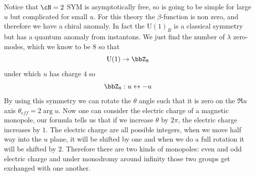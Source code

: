 \documentclass[11pt]{article}
\theoremstyle{definition}
\numberwithin{equation}{section}
\newcommand*\U{\mathrm{U}}
\begin{document}
Notice that $\cN=2$ SYM is asymptotically free, so is going to be simple for large $u$ but complicated for small $u$. For this theory the $\beta$-function is non zero, and therefore we have a chiral anomaly. In fact the $\U(1)_{R}$ is a classical symmetry but has a quantum anomaly from instantons. We just find the number of $\lambda$ zero-modes, which we know to be $8$ so that
\begin{equation}
	\U(1)\rightarrow \bbZ_{8}
\end{equation}
under which $u$ has charge $4$ so
\begin{equation}
	\bbZ_{8}:u\leftrightarrow -u
\end{equation}
By using this symmetry we can rotate the $\theta$ angle such that it is zero on the $\Re u$ axis $\theta_{eff}=2\arg{u}$. Now one can consider the electric charge of a magnetic monopole, our formula tells us that if we increase $\theta$ by $2\pi$, the electric charge increases by $1$. The electric charge are all possible integers, when we move half way into the $u$ plane, it will be shifted by one and when we do a full rotation it will be shifted by $2$. Therefore there are two kinds of monopoles: even and odd electric charge and under monodromy around infinity those two groups get exchanged with one another.
\end{document}
